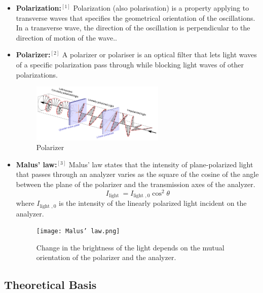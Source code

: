 \documentclass[a4paper]{article}
\begin{document}
\begin{itemize}
	\item \textbf{Polarization:}$^{[1]}$ Polarization (also polarisation) is a property applying to transverse waves that specifies the geometrical orientation of the oscillations. In a transverse wave, the direction of the oscillation is perpendicular to the direction of motion of the wave..

	\item \textbf{Polarizer:}$^{[2]}$ A polarizer or polariser is an optical filter that lets light waves of a specific polarization pass through while blocking light waves of other polarizations.
	      \begin{figure}[!htbp]
		      \centering
		      \includegraphics[width=0.6\textwidth]{polarizer.png}
		      \caption{Polarizer}
	      \end{figure}

	\item \textbf{Malus’ law:}$^{[3]}$ Malus’ law states that the intensity of plane-polarized light that passes through an analyzer varies as the square of the cosine of the angle between the plane of the polarizer and the transmission axes of the analyzer.
	      \begin{equation}
		      I_{\text {light }}=I_{\text {light }, 0} \cos ^{2} \theta
		      \label{eq::Malus’ law}
	      \end{equation}
	      where $I_{\text {light }, 0}$ is the intensity of the linearly polarized light incident on the analyzer.
	      \begin{figure}[!htbp]
		      \centering
		      \texttt{[image: Malus’ law.png]}
		      \caption{Change in the brightness of the light depends on the mutual orientation of the polarizer and the analyzer.}
		      \label{fig::Malus’ law}
	      \end{figure}
\end{itemize}

\subsection{Theoretical Basis}
\end{document}
